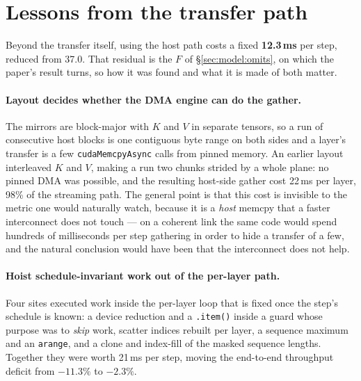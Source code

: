 
\section{Lessons from the transfer path}
\label{app:impl}

Beyond the transfer itself, using the host path costs a fixed \textbf{12.3\,ms}
per step, reduced from 37.0. That residual is the $F$ of
\S\ref{sec:model:omits}, on which the paper's result turns, so how it was found
and what it is made of both matter.

\paragraph{Layout decides whether the DMA engine can do the gather.} The mirrors
are block-major with $K$ and $V$ in separate tensors, so a run of consecutive
host blocks is one contiguous byte range on both sides and a layer's transfer is
a few \texttt{cudaMemcpyAsync} calls from pinned memory. An earlier layout
interleaved $K$ and $V$, making a run two chunks strided by a whole plane: no
pinned DMA was possible, and the resulting host-side gather cost 22\,ms per
layer, 98\% of the streaming path. The general point is that this cost is
invisible to the metric one would naturally watch, because it is a \emph{host}
memcpy that a faster interconnect does not touch --- on a coherent link the same
code would spend hundreds of milliseconds per step gathering in order to hide a
transfer of a few, and the natural conclusion would have been that the
interconnect does not help.

\paragraph{Hoist schedule-invariant work out of the per-layer path.} Four sites
executed work inside the per-layer loop that is fixed once the step's schedule is
known: a device reduction and a \texttt{.item()} inside a guard whose purpose was
to \emph{skip} work, scatter indices rebuilt per layer, a sequence maximum and an
\texttt{arange}, and a clone and index-fill of the masked sequence lengths.
Together they were worth 21\,ms per step, moving the end-to-end throughput
deficit from $-11.3\%$ to $-2.3\%$.


